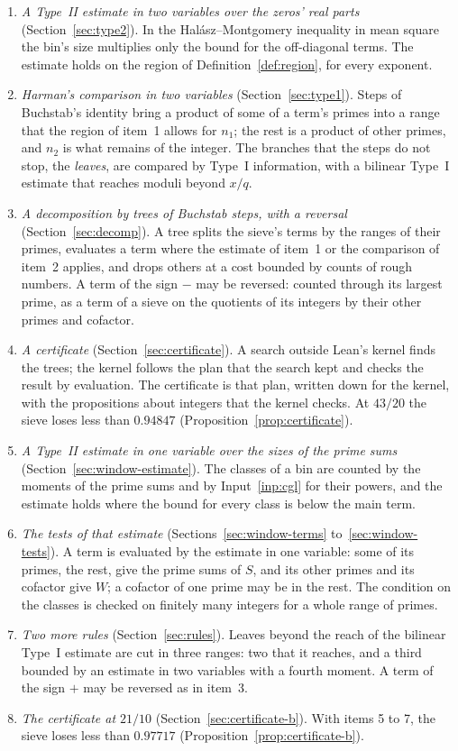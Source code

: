 \documentclass[11pt]{article}
\theoremstyle{definition}
\begin{document}
\begin{enumerate}
\item \emph{A Type~II estimate in two variables over the zeros' real parts} (Section~\ref{sec:type2}). In the
  Hal\'asz--Montgomery inequality in mean square the bin's size multiplies only the bound for the off-diagonal terms.
  The estimate holds on the region of Definition~\ref{def:region}, for every exponent.
\item \emph{Harman's comparison in two variables} (Section~\ref{sec:type1}). Steps of Buchstab's identity bring a
  product of some of a term's primes into a range that the region of item~1 allows for $n_1$; the rest is a product
  of other primes, and $n_2$ is what remains of the integer. The branches that the steps do not stop, the
  \emph{leaves}, are compared by Type~I information, with a bilinear Type~I estimate that reaches moduli beyond
  $x/q$.
\item \emph{A decomposition by trees of Buchstab steps, with a reversal} (Section~\ref{sec:decomp}). A tree splits the
  sieve's terms by the ranges of their primes, evaluates a term where the estimate of item~1 or the
  comparison of item~2 applies, and drops others at a cost bounded by counts of rough numbers. A term of the sign $-$
  may be reversed: counted through its largest prime, as a term of a sieve on the quotients of its integers by their
  other primes and cofactor.
\item \emph{A certificate} (Section~\ref{sec:certificate}). A search outside Lean's kernel finds the trees; the kernel
  follows the plan that the search kept and checks the result by evaluation. The certificate is that plan, written down
  for the kernel, with the propositions about integers that the kernel checks. At $43/20$ the sieve loses less than
  $0.94847$ (Proposition~\ref{prop:certificate}).
\item \emph{A Type~II estimate in one variable over the sizes of the prime sums} (Section~\ref{sec:window-estimate}).
  The classes of a bin are counted by the moments of the prime sums and by Input~\ref{inp:cgl} for their powers, and
  the estimate holds where the bound for every class is below the main term.
\item \emph{The tests of that estimate} (Sections~\ref{sec:window-terms} to~\ref{sec:window-tests}). A term is
  evaluated by the estimate in one variable: some of its primes, the rest, give the prime sums of $S$, and its other
  primes and its cofactor give $W$; a cofactor of one prime may be in the rest. The condition on the classes
  is checked on finitely many integers for a whole range of primes.
\item \emph{Two more rules} (Section~\ref{sec:rules}). Leaves beyond the reach of the bilinear Type~I estimate are cut
  in three ranges: two that it reaches, and a third bounded by an estimate in two variables with a fourth moment. A term
  of the sign $+$ may be reversed as in item~3.
\item \emph{The certificate at $21/10$} (Section~\ref{sec:certificate-b}). With items 5 to 7, the sieve loses less
  than $0.97717$ (Proposition~\ref{prop:certificate-b}).
\end{enumerate}
\end{document}
